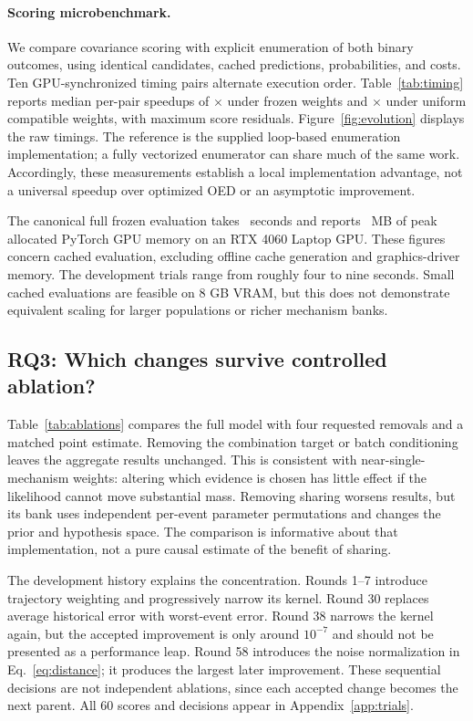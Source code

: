 \paragraph{Scoring microbenchmark.}
We compare covariance scoring with explicit enumeration of both binary outcomes, using identical candidates, cached predictions, probabilities, and costs. Ten GPU-synchronized timing pairs alternate execution order. Table~\ref{tab:timing} reports median per-pair speedups of \FrozenSpeed$\times$ under frozen weights and \UniformSpeed$\times$ under uniform compatible weights, with maximum score residuals. Figure~\ref{fig:evolution} displays the raw timings. The reference is the supplied loop-based enumeration implementation; a fully vectorized enumerator can share much of the same work. Accordingly, these measurements establish a local implementation advantage, not a universal speedup over optimized OED or an asymptotic improvement.

The canonical full frozen evaluation takes \TestRuntime\ seconds and reports \TestVRAM\ MB of peak allocated PyTorch GPU memory on an RTX 4060 Laptop GPU. These figures concern cached evaluation, excluding offline cache generation and graphics-driver memory. The development trials range from roughly four to nine seconds. Small cached evaluations are feasible on 8 GB VRAM, but this does not demonstrate equivalent scaling for larger populations or richer mechanism banks.

\subsection{RQ3: Which changes survive controlled ablation?}
Table~\ref{tab:ablations} compares the full model with four requested removals and a matched point estimate. Removing the combination target or batch conditioning leaves the aggregate results unchanged. This is consistent with near-single-mechanism weights: altering which evidence is chosen has little effect if the likelihood cannot move substantial mass. Removing sharing worsens results, but its bank uses independent per-event parameter permutations and changes the prior and hypothesis space. The comparison is informative about that implementation, not a pure causal estimate of the benefit of sharing.


The development history explains the concentration. Rounds 1--7 introduce trajectory weighting and progressively narrow its kernel. Round 30 replaces average historical error with worst-event error. Round 38 narrows the kernel again, but the accepted improvement is only around $10^{-7}$ and should not be presented as a performance leap. Round 58 introduces the noise normalization in Eq.~\eqref{eq:distance}; it produces the largest later improvement. These sequential decisions are not independent ablations, since each accepted change becomes the next parent. All 60 scores and decisions appear in Appendix~\ref{app:trials}.

